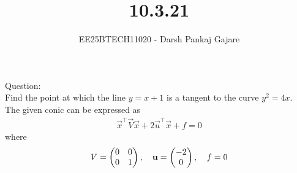 \documentclass{beamer}
\let\solution\relax
\numberwithin{equation}{section}
\begin{document}
\title{10.3.21}
\author{EE25BTECH11020 - Darsh Pankaj Gajare}
{\let\newpage\relax\maketitle}


Question:\\
Find the point at which the line $y=x+1$ is a tangent to the curve $y^2=4x$.\\
\solution
The given conic can be expressed as
\begin{align}
	\vec{x}^\top \vec{V}\vec{x} + 2\vec{u}^\top\vec{x} + f = 0
\end{align}
where
\begin{align}
V = \begin{pmatrix}0 & 0 \\ 0 & 1\end{pmatrix}, \quad
\mathbf{u} = \begin{pmatrix}-2 \\ 0\end{pmatrix}, \quad
f = 0
\end{align}
\end{document}
